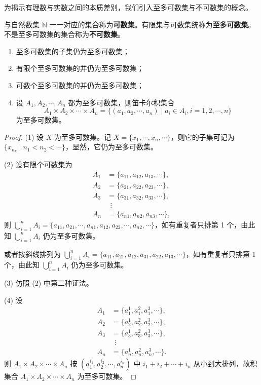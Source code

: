 为揭示有理数与实数之间的本质差别，我们引入至多可数集与不可数集的概念。

\begin{definition}\label{def:1.3.7}
与自然数集 $\mathbb{N}$ 一一对应的集合称为\textbf{可数集}。有限集与可数集统称为\textbf{至多可数集}。不是至多可数集的集合称为\textbf{不可数集}。
\end{definition}

\begin{lemma}\label{lem:1.3.1}
\begin{enumerate}
  \item 至多可数集的子集仍为至多可数集；
  \item 有限个至多可数集的并仍为至多可数集；
  \item 可数个至多可数集的并仍为至多可数集；
  \item 设 $A_1, A_2, \cdots, A_n$ 都为至多可数集，则笛卡尔积集合
  \[
  A_1 \times A_2 \times \cdots \times A_n = \{(a_1, a_2, \cdots, a_n) \mid a_i \in A_i, i = 1, 2, \cdots, n\}
\]
  为至多可数集。
\end{enumerate}
\end{lemma}

\begin{proof}
(1) 设 $X$ 为至多可数集。记 $X = \{x_1, \cdots, x_n, \cdots\}$，则它的子集可记为 $\{x_{n_k} \mid n_1 < n_2 < \cdots\}$，显然，它仍为至多可数集。

(2) 设有限个可数集为
\begin{align*}
A_1 &= \{a_{11}, a_{12}, a_{13}, \cdots\}, \\
A_2 &= \{a_{21}, a_{22}, a_{23}, \cdots\}, \\
A_3 &= \{a_{31}, a_{32}, a_{33}, \cdots\}, \\
&\ \ \vdots \\
A_n &= \{a_{n1}, a_{n2}, a_{n3}, \cdots\},
\end{align*}
则 $\bigcup\limits_{i=1}^n A_i = \{a_{11}, a_{21}, \cdots, a_{n1}, a_{12}, a_{22}, \cdots, a_{n2}, \cdots\}$，如有重复者只排第 1 个，由此知 $\bigcup\limits_{i=1}^n A_i$ 仍为至多可数集。

或者按斜线排列为 $\bigcup\limits_{i=1}^n A_i = \{a_{11}, a_{21}, a_{12}, a_{31}, a_{22}, a_{13}, \cdots\}$，如有重复者只排第 1 个，由此知 $\bigcup\limits_{i=1}^n A_i$ 仍为至多可数集。

(3) 仿照 (2) 中第二种证法。

(4) 设
\begin{align*}
A_1 &= \{a_1^1, a_1^2, a_1^3, \cdots\}, \\
A_2 &= \{a_2^1, a_2^2, a_2^3, \cdots\}, \\
A_3 &= \{a_3^1, a_3^2, a_3^3, \cdots\}, \\
&\ \ \vdots \\
A_n &= \{a_n^1, a_n^2, a_n^3, \cdots\}.
\end{align*}
则 $A_1 \times A_2 \times \cdots \times A_n$ 按 $(a_1^{i_1}, a_2^{i_2}, \cdots, a_n^{i_n})$ 中 $i_1 + i_2 + \cdots + i_n$ 从小到大排列，故积集合 $A_1 \times A_2 \times \cdots \times A_n$ 为至多可数集。
\end{proof}

